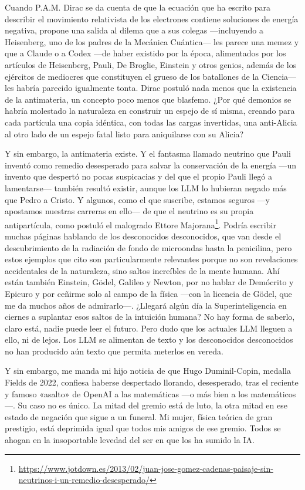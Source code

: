 \documentclass[11pt,a4paper]{article}
\begin{document}
Cuando P.A.M. Dirac se da cuenta de que la ecuación que ha escrito para describir el movimiento relativista de los electrones contiene soluciones de energía negativa, propone una salida al dilema que a sus colegas ---incluyendo a Heisenberg, uno de los padres de la Mecánica Cuántica--- les parece una memez y que a Claude o a Codex ---de haber existido por la época, alimentados por los artículos de Heisenberg, Pauli, De Broglie, Einstein y otros genios, además de los ejércitos de mediocres que constituyen el grueso de los batallones de la Ciencia--- les habría parecido igualmente tonta. Dirac postuló nada menos que la existencia de la antimateria, un concepto poco menos que blasfemo. ¿Por qué demonios se habría molestado la naturaleza en construir un espejo de sí misma, creando para cada partícula una copia idéntica, con todas las cargas invertidas, una anti-Alicia al otro lado de un espejo fatal listo para aniquilarse con su Alicia?

Y sin embargo, la antimateria existe. Y el fantasma llamado neutrino que Pauli inventó como remedio desesperado para salvar la conservación de la energía ---un invento que despertó no pocas suspicacias y del que el propio Pauli llegó a lamentarse--- también resultó existir, aunque los LLM lo hubieran negado más que Pedro a Cristo. Y algunos, como el que suscribe, estamos seguros ---y apostamos nuestras carreras en ello--- de que el neutrino es su propia antipartícula, como postuló el malogrado Ettore Majorana\footnote{\url{https://www.jotdown.es/2013/02/juan-jose-gomez-cadenas-paisaje-sin-neutrinos-i-un-remedio-desesperado/}}. Podría escribir muchas páginas hablando de los desconocidos desconocidos, que van desde el descubrimiento de la radiación de fondo de microondas hasta la penicilina, pero estos ejemplos que cito son particularmente relevantes porque no son revelaciones accidentales de la naturaleza, sino saltos increíbles de la mente humana. Ahí están también Einstein, Gödel, Galileo y Newton, por no hablar de Demócrito y Epicuro y por ceñirme solo al campo de la física ---con la licencia de Gödel, que me da muchos años de admirarlo---. ¿Llegará algún día la Superinteligencia en ciernes a suplantar esos saltos de la intuición humana? No hay forma de saberlo, claro está, nadie puede leer el futuro. Pero dudo que los actuales LLM lleguen a ello, ni de lejos. Los LLM se alimentan de texto y los desconocidos desconocidos no han producido aún texto que permita meterlos en vereda.

Y sin embargo, me manda mi hijo noticia de que Hugo Duminil-Copin, medalla Fields de 2022, confiesa haberse despertado llorando, desesperado, tras el reciente y famoso «asalto» de OpenAI a las matemáticas ---o más bien a los matemáticos---. Su caso no es único. La mitad del gremio está de luto, la otra mitad en ese estado de negación que sigue a un funeral. Mi mujer, física teórica de gran prestigio, está deprimida igual que todos mis amigos de ese gremio. Todos se ahogan en la insoportable levedad del ser en que los ha sumido la IA.
\end{document}
